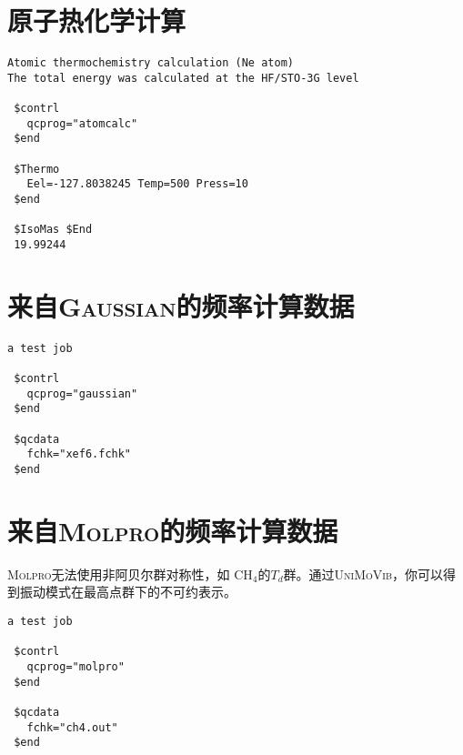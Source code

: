\documentclass[12pt,a4paper,openany,twoside,cap,UTF8]{ctexbook}
\begin{document}
\section{原子热化学计算} \label{sec:exp1}

\begin{colorboxed}[oval=false,boxcolor=blue!75!black,bgcolor=blue!5!white]
\ttfamily\footnotesize
\begin{lstlisting}
Atomic thermochemistry calculation (Ne atom)
The total energy was calculated at the HF/STO-3G level

 $contrl
   qcprog="atomcalc"
 $end

 $Thermo
   Eel=-127.8038245 Temp=500 Press=10
 $end

 $IsoMas $End
 19.99244
\end{lstlisting}\end{colorboxed}

\section{来自\textsc{Gaussian}的频率计算数据} \label{sec:exp2}

\begin{colorboxed}[oval=false,boxcolor=blue!75!black,bgcolor=blue!5!white]
\ttfamily\footnotesize
\begin{lstlisting}
a test job

 $contrl
   qcprog="gaussian"
 $end

 $qcdata
   fchk="xef6.fchk"
 $end
\end{lstlisting}\end{colorboxed}

\newpage
\section{来自\textsc{Molpro}的频率计算数据} \label{sec:exp3}

\textsc{Molpro}无法使用非阿贝尔群对称性，如 CH$_4$的$T_d$群。通过\textsc{UniMoVib}，你可以得到振动模式在最高点群下的不可约表示。

\begin{colorboxed}[oval=false,boxcolor=blue!75!black,bgcolor=blue!5!white]
\ttfamily\footnotesize
\begin{lstlisting}
a test job

 $contrl
   qcprog="molpro"
 $end

 $qcdata
   fchk="ch4.out"
 $end
\end{lstlisting}\end{colorboxed}
\end{document}
